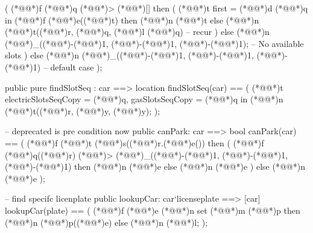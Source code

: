 \documentclass[a4paper]{article}
\begin{document}
\begin{vdm_al}
    (
        (*@@*)f (*@@*)q (*@\vdmnotcovered{<}@*)> (*@\vdmnotcovered{}@*)[] then
        (
            (*@@*)t first = (*@@*)d (*@@*)q in
            (*@@*)f (*@@*)e((*@@*)t) then
                (*@@*)n (*@@*)t
            else
                (*@@*)n (*@@*)t((*@@*)r, (*@@*)q, (*@@*)l (*@@*)q)  -- recur
        )
        else
            (*@@*)n (*@@*)_((*@\vdmnotcovered{}@*)-(*@\vdmnotcovered{}@*)1, (*@\vdmnotcovered{}@*)-(*@\vdmnotcovered{}@*)1, (*@\vdmnotcovered{}@*)-(*@\vdmnotcovered{}@*)1);  -- No available slots
    )
    else
        (*@@*)n (*@@*)_((*@\vdmnotcovered{}@*)-(*@\vdmnotcovered{}@*)1, (*@\vdmnotcovered{}@*)-(*@\vdmnotcovered{}@*)1, (*@\vdmnotcovered{}@*)-(*@\vdmnotcovered{}@*)1)  -- default case
);


public pure findSlotSeq : car ==> location
findSlotSeq(car) ==
(
    (*@@*)t electricSlotsSeqCopy = (*@@*)q, gasSlotsSeqCopy = (*@@*)q in
    (*@@*)n (*@@*)t((*@@*)r, (*@@*)y, (*@@*)y);
);

-- deprecated is pre condition now
public canPark: car ==> bool
canPark(car) ==
(
    (*@@*)f (*@@*)t (*@@*)s((*@@*)r.(*@@*)e()) then
    (
        (*@@*)f (*@@*)q((*@@*)r) (*@\vdmnotcovered{<}@*)> (*@@*)_((*@\vdmnotcovered{}@*)-(*@\vdmnotcovered{}@*)1, (*@\vdmnotcovered{}@*)-(*@\vdmnotcovered{}@*)1, (*@\vdmnotcovered{}@*)-(*@\vdmnotcovered{}@*)1) then
            (*@@*)n (*@@*)e
        else
            (*@@*)n (*@@*)e
    )
    else
        (*@@*)n (*@@*)e
);

-- find specifc licenplate 
public lookupCar: car`licenseplate ==> [car]
lookupCar(plate) ==
(
    (*@@*)f (*@@*)e (*@@*)n set (*@@*)m (*@@*)p then
        (*@@*)n (*@@*)p((*@@*)e)
    else
        (*@@*)n (*@@*)l;
);


\end{vdm_al}
\end{document}
